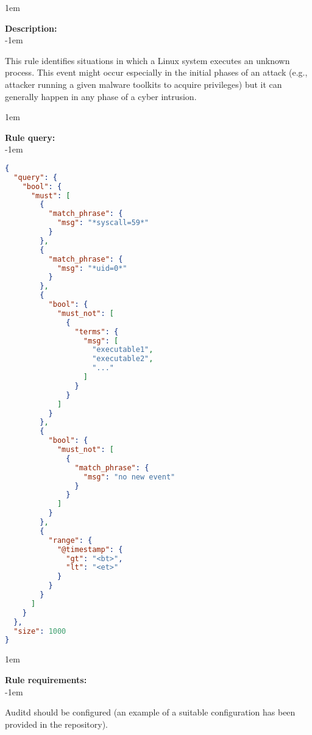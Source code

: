 \openup 1em

{\bf Description:} \\

\openup -1em
\vspace{-2em}


This rule identifies situations in which a Linux system executes an unknown process. This event might occur especially in the initial phases of an attack (e.g., attacker running a given malware toolkits to acquire privileges) but it can generally happen in any phase of a cyber intrusion.

\openup 1em

{\bf Rule query:} \\

\openup -1em
\vspace{-2em}

\begin{lstlisting}[language=json,firstnumber=1]
{
  "query": {
    "bool": {
      "must": [
        {
          "match_phrase": {
            "msg": "*syscall=59*"
          }
        },
        {
          "match_phrase": {
            "msg": "*uid=0*"
          }
        },
        {
          "bool": {
            "must_not": [
              {
                "terms": {
                  "msg": [
                    "executable1",
                    "executable2",
                    "..."
                  ]
                }
              }
            ]
          }
        },
        {
          "bool": {
            "must_not": [
              {
                "match_phrase": {
                  "msg": "no new event"
                }
              }
            ]
          }
        },
        {
          "range": {
            "@timestamp": {
              "gt": "<bt>",
              "lt": "<et>"
            }
          }
        }
      ]
    }
  },
  "size": 1000
}
\end{lstlisting}

\openup 1em

{\bf Rule requirements:} \\

\openup -1em
\vspace{-2em}

Auditd should be configured (an example of a suitable configuration has been provided in the repository).

